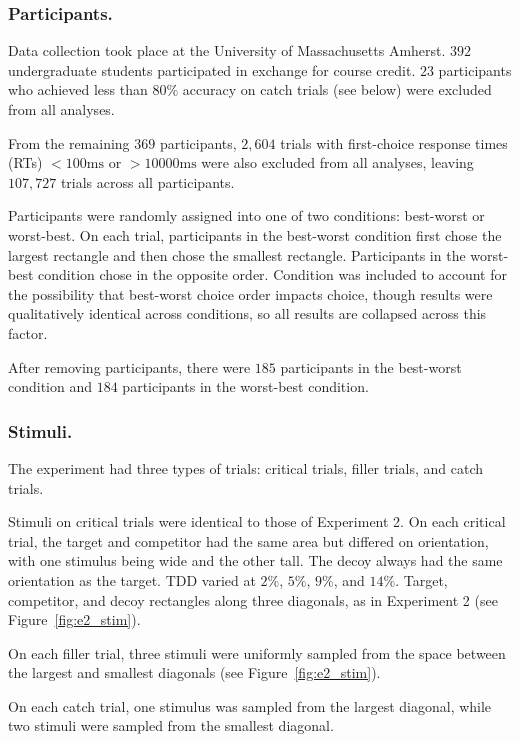 \subsubsection{Participants.}
Data collection took place at the University of Massachusetts Amherst. $392$ undergraduate students participated in exchange for course credit. $23$ participants who achieved less than $80\%$ accuracy on catch trials (see below) were excluded from all analyses. 

From the remaining $369$ participants, $2,604$ trials with first-choice response times (RTs) $<100\text{ms}$ or  $>10000\text{ms}$ were also excluded from all analyses, leaving $107,727$ trials across all participants.

Participants were randomly assigned into one of two conditions: best-worst or worst-best. On each trial, participants in the best-worst condition first chose the largest rectangle and then chose the smallest rectangle. Participants in the worst-best condition chose in the opposite order. Condition was included to account for the possibility that best-worst choice order impacts choice, though results were qualitatively identical across conditions, so all results are collapsed across this factor. 

After removing participants, there were $185$ participants in the best-worst condition and $184$ participants in the worst-best condition.

\subsubsection{Stimuli.}
The experiment had three types of trials: critical trials, filler trials, and catch trials. 

Stimuli on critical trials were identical to those of Experiment 2. On each critical trial, the target and competitor had the same area but differed on orientation, with one stimulus being wide and the other tall. The decoy always had the same orientation as the target. TDD varied at $2\%$, $5\%$, $9\%$, and $14\%$. Target, competitor, and decoy rectangles along three diagonals, as in Experiment 2 (see Figure~\ref{fig:e2_stim}). 

On each filler trial, three stimuli were uniformly sampled from the space between the largest and smallest diagonals (see Figure~\ref{fig:e2_stim}).

On each catch trial, one stimulus was sampled from the largest diagonal, while two stimuli were sampled from the smallest diagonal.


